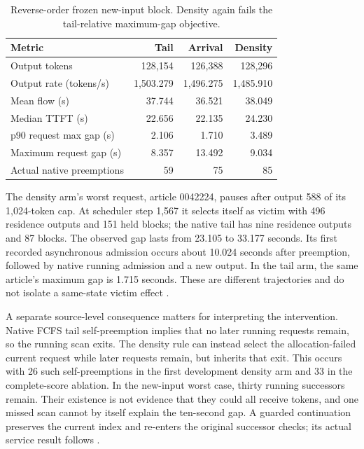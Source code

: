 \documentclass[10pt]{article}
\begin{document}
\begin{table}[t]
\centering\small
\caption{Reverse-order frozen new-input block. Density again fails the tail-relative maximum-gap objective.}
\label{tab:residencyfreshb2}
\begin{tabular}{lrrr}
\toprule
Metric & Tail & Arrival & Density \\
\midrule
Output tokens & 128,154 & 126,388 & 128,296 \\
Output rate (tokens/s) & 1,503.279 & 1,496.275 & 1,485.910 \\
Mean flow (s) & 37.744 & 36.521 & 38.049 \\
Median TTFT (s) & 22.656 & 22.135 & 24.230 \\
p90 request max gap (s) & 2.106 & 1.710 & 3.489 \\
Maximum request gap (s) & 8.357 & 13.492 & 9.034 \\
Actual native preemptions & 59 & 75 & 85 \\
\bottomrule
\end{tabular}
\end{table}

The density arm's worst request, article 0042224, pauses after output 588 of its 1,024-token cap. At scheduler step 1,567 it selects itself as victim with 496 residence outputs and 151 held blocks; the native tail has nine residence outputs and 87 blocks. The observed gap lasts from 23.105 to 33.177 seconds. Its first recorded asynchronous admission occurs about 10.024 seconds after preemption, followed by native running admission and a new output. In the tail arm, the same article's maximum gap is 1.715 seconds. These are different trajectories and do not isolate a same-state victim effect \cite{residencyfreshchain}.

A separate source-level consequence matters for interpreting the intervention. Native FCFS tail self-preemption implies that no later running requests remain, so the running scan exits. The density rule can instead select the allocation-failed current request while later requests remain, but inherits that exit. This occurs with 26 such self-preemptions in the first development density arm and 33 in the complete-score ablation. In the new-input worst case, thirty running successors remain. Their existence is not evidence that they could all receive tokens, and one missed scan cannot by itself explain the ten-second gap. A guarded continuation preserves the current index and re-enters the original successor checks; its actual service result follows \cite{residencyselfsuffix}.
\end{document}
